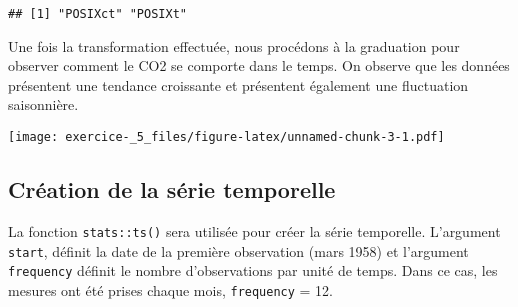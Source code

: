 \documentclass[
]{article}
\newenvironment{Shaded}{\begin{snugshade}}{\end{snugshade}}
\newcommand{\DataTypeTok}[1]{\textcolor[rgb]{0.13,0.29,0.53}{#1}}
\newcommand{\DecValTok}[1]{\textcolor[rgb]{0.00,0.00,0.81}{#1}}
\newcommand{\KeywordTok}[1]{\textcolor[rgb]{0.13,0.29,0.53}{\textbf{#1}}}
\newcommand{\NormalTok}[1]{#1}
\newcommand{\OperatorTok}[1]{\textcolor[rgb]{0.81,0.36,0.00}{\textbf{#1}}}
\newcommand{\StringTok}[1]{\textcolor[rgb]{0.31,0.60,0.02}{#1}}
\begin{document}
\begin{Shaded}
\end{Shaded}

\begin{verbatim}
## [1] "POSIXct" "POSIXt"
\end{verbatim}

Une fois la transformation effectuée, nous procédons à la graduation
pour observer comment le CO2 se comporte dans le temps. On observe que
les données présentent une tendance croissante et présentent également
une fluctuation saisonnière.

\begin{Shaded}
\end{Shaded}

\texttt{[image: exercice-\_5\_files/figure-latex/unnamed-chunk-3-1.pdf]}

\hypertarget{cruxe9ation-de-la-suxe9rie-temporelle}{%
\subsection{Création de la série
temporelle}\label{cruxe9ation-de-la-suxe9rie-temporelle}}

La fonction \texttt{stats::ts()} sera utilisée pour créer la série
temporelle. L'argument \texttt{start}, définit la date de la première
observation (mars 1958) et l'argument \texttt{frequency} définit le
nombre d'observations par unité de temps. Dans ce cas, les mesures ont
été prises chaque mois, \texttt{frequency} = 12.

\begin{Shaded}
\end{Shaded}
\end{document}
